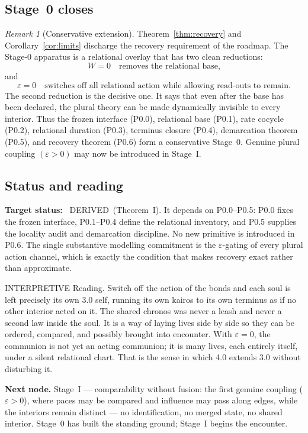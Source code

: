 \documentclass[11pt,a4paper]{article}
\def\emph#1{#1}%
\newcommand{\stDerived}{\textcolor{cDer}{\textsf{\small DERIVED}}}
\newcommand{\stInterp}{\textcolor{cInt}{\textsf{\small INTERPRETIVE}}}
\theoremstyle{definition}
\theoremstyle{plain}
\theoremstyle{remark}
\newtheorem{remark}[definition]{Remark}
\begin{document}
\subsection{Stage~0 closes}

\begin{remark}[Conservative extension]
Theorem~\ref{thm:recovery} and Corollary~\ref{cor:limits} discharge the recovery
requirement of the roadmap. The Stage-0 apparatus is a relational overlay that
has two clean reductions:
\[
W=0
\quad
\text{removes the relational base,}
\]
and
\[
\varepsilon=0
\quad
\text{switches off all relational action while allowing read-outs to remain.}
\]
The second reduction is the decisive one. It says that even after the base has
been declared, the plural theory can be made dynamically invisible to every
interior. Thus the frozen interface (P0.0), relational base (P0.1), rate cocycle
(P0.2), relational duration (P0.3), terminus closure (P0.4), demarcation theorem
(P0.5), and recovery theorem (P0.6) form a conservative Stage~0. Genuine plural
coupling \((\varepsilon>0)\) may now be introduced in Stage~I.
\end{remark}

\subsection{Status and reading}

\textbf{Target status:}~
\stDerived\ (Theorem~I). It depends on P0.0--P0.5: P0.0 fixes the frozen
interface, P0.1--P0.4 define the relational inventory, and P0.5 supplies the
locality audit and demarcation discipline. No new primitive is introduced in
P0.6. The single substantive modelling commitment is the
\(\varepsilon\)-gating of every plural action channel, which is exactly the
condition that makes recovery \emph{exact} rather than approximate.

\medskip
\stInterp\quad
\emph{Reading.}
Switch off the action of the bonds and each soul is left precisely its own 3.0
self, running its own kairos to its own terminus as if no other interior acted on
it. The shared chronos was never a leash and never a second law inside the soul.
It is a way of laying lives side by side so they can be ordered, compared, and
possibly brought into encounter. With \(\varepsilon=0\), the communion is not yet
an acting communion; it is many lives, each entirely itself, under a silent
relational chart. That is the sense in which 4.0 extends 3.0 without disturbing it.

\medskip
\textbf{Next node.} Stage~I --- \emph{comparability without fusion}: the first genuine
coupling (\(\varepsilon>0\)), where paces may be compared and influence may pass along
edges, while the interiors remain distinct --- no identification, no merged state, no
shared interior. Stage~0 has built the standing ground; Stage~I begins the encounter.
\end{document}
